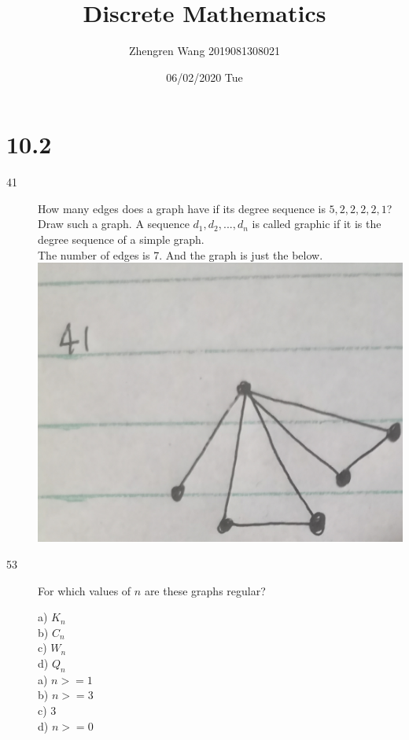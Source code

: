 \documentclass[UTF8]{article}
\title{Discrete Mathematics}
\author{Zhengren Wang 2019081308021}
\date{06/02/2020 Tue}
\begin{document}
\maketitle 

\part{10.2}
\begin{description}
    \item[41]How many edges does a graph have if its degree sequence is $5, 2, 2, 2, 2, 1$? Draw such a graph.  A sequence $d_1, d_2,...,d_n$ is called graphic if it is the degree sequence of a simple graph. \\
        The number of edges is 7. And the graph is just the below. \\
        \includegraphics[scale=0.1]{../imgs/10_2_41.jpg}


    \item[53]For which values of $n$ are these graphs regular? 

            a) $K_n$                                              \\
            b) $C_n$                                              \\
            c) $W_n$                                              \\
            d) $Q_n$                                              \\

            a) $n>=1$                                              \\
            b) $n>=3$                                              \\
            c) $3$                                              \\
            d) $n>=0$                                              \\
\end{description}
\end{document}
